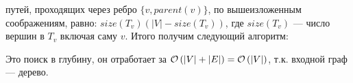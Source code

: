 путей, проходящих через ребро $\lbrace v, parent(v) \rbrace$, по вышеизложенным соображениям, равно: $size(T_v)(|V|-size(T_v))$,
где $size(T_v)$ --- число вершин в $T_v$ включая саму $v$. Итого получим следующий алгоритм:
\begin{algorithmic}
		\EndIf
	\EndFor
\EndFunction
\end{algorithmic}
Это поиск в глубину, он отработает за $\mathcal{O}\left(|V|+|E|\right)=\mathcal{O}\left(|V|\right)$, т.к. входной граф --- дерево. \xqed
\task{}

